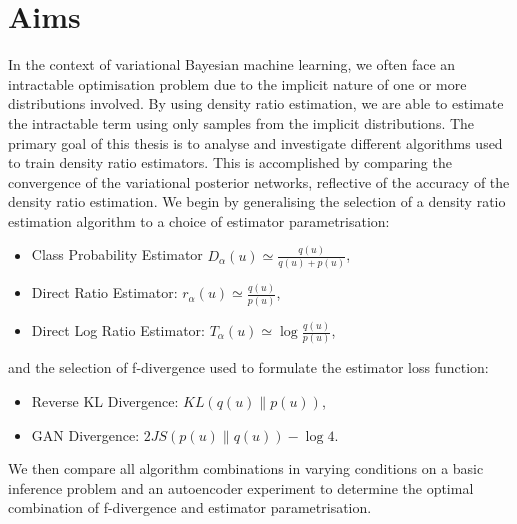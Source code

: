 \documentclass[honours,12pt]{unswthesis}
\numberwithin{equation}{section}
\theoremstyle{definition}
\begin{document}
\section{Aims}
In the context of variational Bayesian machine learning, we often face an intractable optimisation problem due to the implicit nature of one or more distributions involved. By using density ratio estimation, we are able to estimate the intractable term using only samples from the implicit distributions. The primary goal of this thesis is to analyse and investigate different algorithms used to train density ratio estimators. This is accomplished by comparing the convergence of the variational posterior networks, reflective of the accuracy of the density ratio estimation. We begin by generalising the selection of a density ratio estimation algorithm to a choice of estimator parametrisation:
\begin{itemize}
\item Class Probability Estimator $D_\alpha(u)\simeq \frac{q(u)}{q(u)+p(u)}$,
\item Direct Ratio Estimator: $r_\alpha(u)\simeq \frac{q(u)}{p(u)}$,
\item Direct Log Ratio Estimator: $T_\alpha(u)\simeq \log \frac{q(u)}{p(u)}$,
\end{itemize} 
and the selection of f-divergence used to formulate the estimator loss function:
\begin{itemize}
\item Reverse KL Divergence: $KL(q(u)\|p(u))$,
\item GAN Divergence: $2JS(p(u)\|q(u))-\log 4$.
\end{itemize}
We then compare all algorithm combinations in varying conditions on a basic inference problem and an autoencoder experiment to determine the optimal combination of f-divergence and estimator parametrisation.
\end{document}

